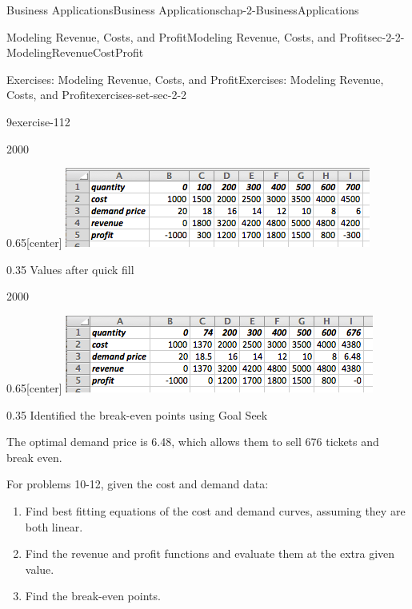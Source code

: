 \documentclass[oneside,10pt,]{book}
\numberwithin{equation}{section}
\begin{document}
\begin{chapterptx}{Business Applications}{}{Business Applications}{}{}{chap-2-BusinessApplications}
\begin{sectionptx}{Modeling Revenue, Costs, and Profit}{}{Modeling Revenue, Costs, and Profit}{}{}{sec-2-2-ModelingRevenueCostProfit}
\begin{exercises-subsection-numberless}{Exercises: Modeling Revenue, Costs, and Profit}{}{Exercises: Modeling Revenue, Costs, and Profit}{}{}{exercises-set-sec-2-2}
\begin{divisionexercise}{9}{}{}{exercise-112}
\begin{sidebyside}{2}{0}{0}{0}
\begin{sbspanel}{0.65}[center]
\includegraphics[width=1\linewidth]{images/sec2-2-sol9b.png}
\end{sbspanel}%
\begin{sbspanel}{0.35}%
\hypertarget{p-748}{}%
Values after quick fill%
\end{sbspanel}%
\end{sidebyside}%
\begin{sidebyside}{2}{0}{0}{0}%
\begin{sbspanel}{0.65}[center]%
\includegraphics[width=1\linewidth]{images/sec2-2-sol9c.png}
\end{sbspanel}%
\begin{sbspanel}{0.35}%
\hypertarget{p-749}{}%
Identified the break-even points using Goal Seek%
\end{sbspanel}%
\end{sidebyside}%
\par
\hypertarget{p-750}{}%
The optimal demand price is \textdollar{}6.48, which allows them to sell 676 tickets and break even.%
\end{divisionexercise}%
\par\medskip\noindent%
\hypertarget{exercisegroup-8}{}%
\hypertarget{p-751}{}%
For problems 10-12, given the cost and demand data:%
\leavevmode%
\begin{enumerate}[label=(\alph*)]
\item\hypertarget{li-216}{}\hypertarget{p-752}{}%
Find best fitting equations of the cost and demand curves, assuming they are both linear.%
\item\hypertarget{li-217}{}\hypertarget{p-753}{}%
Find the revenue and profit functions and evaluate them at the extra given value.%
\item\hypertarget{li-218}{}\hypertarget{p-754}{}%
Find the break-even points.%
\end{enumerate}

\end{exercises-subsection-numberless}
\end{sectionptx}
\end{chapterptx}
\end{document}
